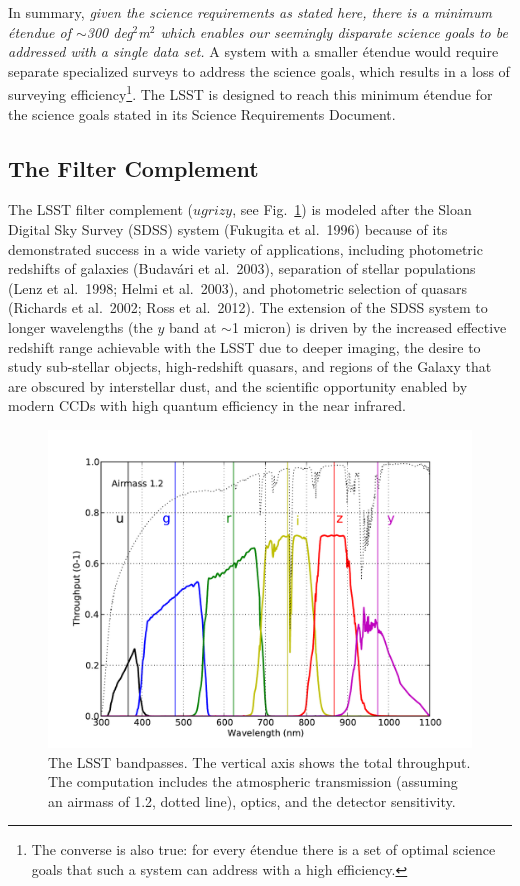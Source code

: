 \documentclass{emulateapj}
\begin{document}
In summary,
{\it given the science requirements as stated here, there is a
minimum \'etendue of $\sim$300 deg$^2$m$^2$ which enables our seemingly
disparate science goals to be addressed with a single data set.}
A system with a smaller \'etendue would require separate specialized surveys
to address the science goals, which results in a loss of surveying
efficiency\footnote{The converse is also true: for every \'etendue
there is a set of optimal science goals that such a system can 
address with a high efficiency.}. The LSST is designed to reach this 
minimum \'etendue for the science goals stated in its Science Requirements 
Document. 



\subsection{  The Filter Complement }

The LSST filter complement ($ugrizy$, see Fig.~\ref{Fig:filters}) is modeled after the Sloan
Digital Sky Survey 
(SDSS) system (Fukugita et al.~1996) because of its demonstrated success in a wide
variety of applications, including photometric redshifts of galaxies (Budav\'{a}ri
et al.~2003), separation of stellar populations (Lenz et al.~1998; Helmi et al.~2003), 
and photometric selection of quasars (Richards et al.~2002; Ross et al.~2012). The extension of the 
SDSS system to longer wavelengths
(the $y$ band at $\sim$1 micron) is driven by the increased effective redshift 
range achievable with the LSST due to deeper imaging, the desire to study sub-stellar 
objects, high-redshift quasars, and regions of the Galaxy that are obscured by
interstellar dust, and
the scientific opportunity enabled by modern CCDs with high quantum efficiency 
in the near infrared.  


\begin{figure}
\hskip -0.13in
\includegraphics[width=1.1\hsize,clip]{filters_y4.pdf}
\caption{The LSST bandpasses. The vertical axis shows the total throughput. The computation 
includes the atmospheric transmission (assuming an airmass of 1.2, %
dotted line), optics, and the detector sensitivity.} 
\label{Fig:filters}
\end{figure}
\end{document}

